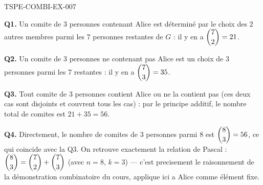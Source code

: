 \begin{corrige}{TSPE-COMBI-EX-007}

\textbf{Q1.} Un comite de $3$ personnes contenant Alice est déterminé par le choix des $2$ autres membres parmi les $7$ personnes restantes de $G$ : il y en a $\dbinom{7}{2} = 21$.

\textbf{Q2.} Un comite de $3$ personnes ne contenant pas Alice est un choix de $3$ personnes parmi les $7$ restantes : il y en a $\dbinom{7}{3} = 35$.

\textbf{Q3.} Tout comite de $3$ personnes contient Alice ou ne la contient pas (ces deux cas sont disjoints et couvrent tous les cas) : par le principe additif, le nombre total de comites est $21+35 = 56$.

\textbf{Q4.} Directement, le nombre de comites de $3$ personnes parmi $8$ est $\dbinom{8}{3} = 56$, ce qui coincide avec la Q3. On retrouve exactement la relation de Pascal : $\dbinom{8}{3} = \dbinom{7}{2}+\dbinom{7}{3}$ (avec $n=8$, $k=3$) — c'est precisement le raisonnement de la démonstration combinatoire du cours, applique ici a Alice comme élément fixe.

\end{corrige}
